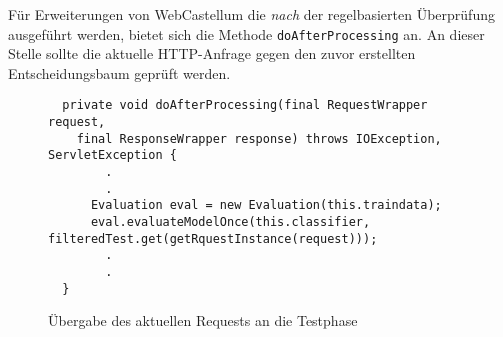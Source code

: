 Für Erweiterungen von WebCastellum die \emph{nach} der regelbasierten Überprüfung ausgeführt werden, bietet sich die Methode \verb=doAfterProcessing= an. An dieser Stelle sollte die aktuelle HTTP-Anfrage gegen den zuvor erstellten Entscheidungsbaum geprüft werden.\\

\begin{figure}[h]
  \centering
  \begin{lstlisting}
  private void doAfterProcessing(final RequestWrapper request,
    final ResponseWrapper response) throws IOException, ServletException {
        .
        .
      Evaluation eval = new Evaluation(this.traindata);
      eval.evaluateModelOnce(this.classifier, filteredTest.get(getRquestInstance(request)));
        .
        .
  }
\end{lstlisting}
\caption{Übergabe des aktuellen Requests an die Testphase}
\label{fig:wekatest}

\end{figure}

